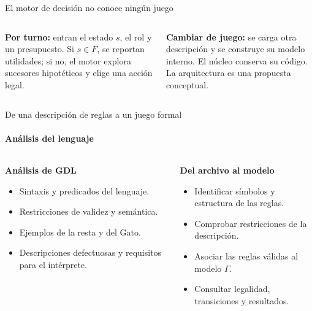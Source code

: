 \documentclass[aspectratio=169,10pt,t]{beamer}
\begin{document}
\begin{frame}{El motor de decisión no conoce ningún juego}
\vspace{0.35cm}
\begin{columns}[T]
\begin{tarjeta}[vino]
\footnotesize\raggedright
\textbf{Por turno:} entran el estado $s$, el rol y un presupuesto. Si $s\in F$, se reportan utilidades; si no, el motor explora sucesores hipotéticos y elige una acción legal.
\end{tarjeta}
\begin{tarjeta}[azulp]
\footnotesize\raggedright
\textbf{Cambiar de juego:} se carga otra descripción y se construye su modelo interno. El núcleo conserva su código. La arquitectura es una propuesta conceptual.
\end{tarjeta}
\end{columns}
\end{frame}

\begin{frame}{De una descripción de reglas a un juego formal}
\framesubtitle{Análisis del lenguaje}
\begin{columns}[T]
\begin{tarjeta}[azulp]
{\bfseries Análisis de GDL}
{\small
\begin{itemize}\setlength\itemsep{4pt}
\item Sintaxis y predicados del lenguaje.
\item Restricciones de validez y semántica.
\item Ejemplos de la resta y del Gato.
\item Descripciones defectuosas y requisitos para el intérprete.
\end{itemize}}
\end{tarjeta}
\begin{tarjeta}[vino]
{\bfseries Del archivo al modelo}
\begin{itemize}\setlength\itemsep{4pt}
\item Identificar símbolos y estructura de las reglas.
\item Comprobar restricciones de la descripción.
\item Asociar las reglas válidas al modelo $\Gamma$.
\item Consultar legalidad, transiciones y resultados.
\end{itemize}
\end{tarjeta}
\end{columns}
\end{frame}
\end{document}
